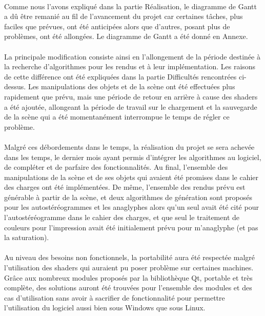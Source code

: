 \paragraph{}
Comme nous l'avons expliqué dans la partie Réalisation, le diagramme de Gantt a dû être remanié au fil de l'avancement du projet car certaines tâches, plus faciles que prévues, ont été anticipées alors que d'autres, posant plus de problèmes, ont été allongées.
Le diagramme de Gantt a été donné en Annexe.

\paragraph{}
La principale modification consiste ainsi en l'allongement de la période destinée à la recherche d'algorithmes pour les rendus et à leur implémentation. Les raisons de cette différence ont été expliquées dans la partie Difficultés rencontrées ci-dessus.
Les manipulations des objets et de la scène ont été effectuées plus rapidement que prévu, mais une période de retour en arrière à cause des shaders a été ajoutée, allongeant la période de travail sur le chargement et la sauvegarde de la scène qui a été momentanément interrompue le temps de régler ce problème.

\paragraph{}
Malgré ces débordements dans le temps, la réalisation du projet se sera achevée dans les temps, le dernier mois ayant permis d'intégrer les algorithmes au logiciel, de compléter et de parfaire des fonctionnalités.
Au final, l'ensemble des manipulations de la scène et de ses objets qui avaient été promises dans le cahier des charges ont été implémentées. De même, l'ensemble des rendus prévu est générable à partir de la scène, et deux algorithmes de génération sont proposés pour les autostéréogrammes et les anaglyphes alors qu'un seul avait été cité pour l'autostéréogramme dans le cahier des charges, et que seul le traitement de couleurs pour l'impression avait été initialement prévu pour m'anaglyphe (et pas la saturation).

\paragraph{}
Au niveau des besoins non fonctionnels, la portabilité aura été respectée malgré l'utilisation des shaders qui auraient pu poser problème sur certaines machines. Grâce aux nombreux modules proposés par la bibliothèque Qt, portable et très complète, des solutions auront été trouvées pour l'ensemble des modules et des cas d'utilisation sans avoir à sacrifier de fonctionnalité pour permettre l'utilisation du logiciel aussi bien sous Windows que sous Linux.

